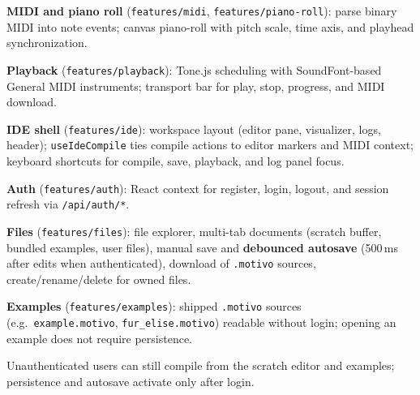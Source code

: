 \noindent\textbf{MIDI and piano roll} (\texttt{features/midi}, \texttt{features/piano-roll}): parse binary MIDI into
note events; canvas piano-roll with pitch scale, time axis, and playhead synchronization.

\noindent\textbf{Playback} (\texttt{features/playback}): Tone.js scheduling with SoundFont-based General MIDI
instruments; transport bar for play, stop, progress, and MIDI download.

\noindent\textbf{IDE shell} (\texttt{features/ide}): workspace layout (editor pane, visualizer, logs, header);
\texttt{useIdeCompile} ties compile actions to editor markers and MIDI context; keyboard shortcuts for compile, save,
playback, and log panel focus.

\noindent\textbf{Auth} (\texttt{features/auth}): React context for register, login, logout, and session refresh via
\texttt{/api/auth/*}.

\noindent\textbf{Files} (\texttt{features/files}): file explorer, multi-tab documents (scratch buffer, bundled
examples, user files), manual save and \textbf{debounced autosave} (500\,ms after edits when authenticated),
download of \texttt{.motivo} sources, create/rename/delete for owned files.

\noindent\textbf{Examples} (\texttt{features/examples}): shipped \texttt{.motivo} sources
(e.g.\ \texttt{example.motivo},
\texttt{fur\_elise.motivo}) readable without login; opening an example does not require persistence.

Unauthenticated users can still compile from the scratch editor and examples; persistence and autosave activate only
after login.
